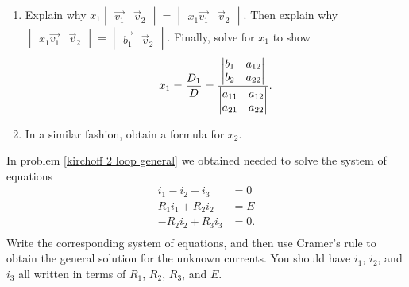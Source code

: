 \begin{problem}
\begin{enumerate}
 \item Explain why $x_1\begin{vmatrix}\vec{v_1}&\vec v_2\end{vmatrix}=\begin{vmatrix}x_1\vec{v_1}&\vec v_2\end{vmatrix}$.  Then explain why $\begin{vmatrix}x_1\vec{v_1}&\vec v_2\end{vmatrix} = \begin{vmatrix}\vec{b_1}&\vec v_2\end{vmatrix}$.  Finally, solve for $x_1$ to show $$x_1 = \frac{D_1}{D}=\frac{\begin{vmatrix}\begin{matrix} b_1\\b_2 \end{matrix}&\begin{matrix} a_{12}\\a_{22} \end{matrix} \end{vmatrix}}{\begin{vmatrix}\begin{matrix} a_{11}\\a_{21} \end{matrix}&\begin{matrix} a_{12}\\a_{22} \end{matrix} \end{vmatrix}}.$$
 \item In a similar fashion, obtain a formula for $x_2$. 
\end{enumerate}
\end{problem}

\begin{problem}
 In problem \ref{kirchoff 2 loop general} we obtained needed to solve the system of equations 
$$
\begin{array}{rl}
i_1-i_2-i_3&=0\\
R_1i_1+R_2i_2&=E\\
-R_2 i_2 +R_3i_3&=0.\\
\end{array}
$$
Write the corresponding system of equations, and then use Cramer's rule to obtain the general solution for the unknown currents.  You should have $i_1$, $i_2$, and  $i_3$ all written in terms of $R_1$, $R_2$, $R_3$, and $E$. 
\end{problem}


